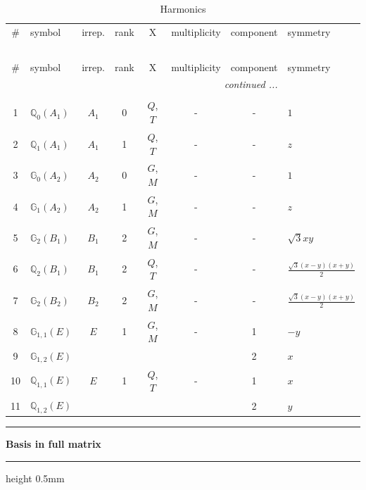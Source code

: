 \documentclass[fleqn,10pt,landscape]{jsarticle}
\begin{document}
\renewcommand{\arraystretch}{1.6}
\begin{longtable}[l]{clcccccl}
\captionsetup{justification=raggedright, singlelinecheck=off}
\caption{Harmonics}
 \\
 \hline \hline
\# & symbol & irrep. & rank & X & multiplicity & component & symmetry \\ \hline \endfirsthead

\multicolumn{7}{l}{\tablename\ \thetable{}} \\
 \hline \hline
\# & symbol & irrep. & rank & X & multiplicity & component & symmetry \\ \hline \endhead

 \hline \hline
\multicolumn{7}{r}{\footnotesize\it continued ...} \\ \endfoot

 \hline \hline
\multicolumn{7}{r}{} \\ \endlastfoot

1 & $\mathbb{Q}_{0}(A_{1})$ & $A_{1}$ & 0 & $Q$, $T$ & - & - & $1$ \\ \hline
2 & $\mathbb{Q}_{1}(A_{1})$ & $A_{1}$ & 1 & $Q$, $T$ & - & - & $z$ \\ \hline
3 & $\mathbb{G}_{0}(A_{2})$ & $A_{2}$ & 0 & $G$, $M$ & - & - & $1$ \\ \hline
4 & $\mathbb{G}_{1}(A_{2})$ & $A_{2}$ & 1 & $G$, $M$ & - & - & $z$ \\ \hline
5 & $\mathbb{G}_{2}(B_{1})$ & $B_{1}$ & 2 & $G$, $M$ & - & - & $\sqrt{3} x y$ \\ \hline
6 & $\mathbb{Q}_{2}(B_{1})$ & $B_{1}$ & 2 & $Q$, $T$ & - & - & $\frac{\sqrt{3} \left(x - y\right) \left(x + y\right)}{2}$ \\ \hline
7 & $\mathbb{G}_{2}(B_{2})$ & $B_{2}$ & 2 & $G$, $M$ & - & - & $\frac{\sqrt{3} \left(x - y\right) \left(x + y\right)}{2}$ \\ \hline
8 & $\mathbb{G}_{1,1}(E)$ & $E$ & 1 & $G$, $M$ & - & 1 & $- y$ \\
9 & $\mathbb{G}_{1,2}(E)$ &  &  &  &  & 2 & $x$ \\ \hline
10 & $\mathbb{Q}_{1,1}(E)$ & $E$ & 1 & $Q$, $T$ & - & 1 & $x$ \\
11 & $\mathbb{Q}_{1,2}(E)$ &  &  &  &  & 2 & $y$ \\
\end{longtable}
\vspace{5mm}
\noindent \rule[0.5mm]{5mm}{0.5mm}\hspace{3mm}\textbf{Basis in full matrix}\hspace{3mm}\leaders\hrule height 0.5mm\hfill\kern0pt
\vspace{3mm}
\end{document}
